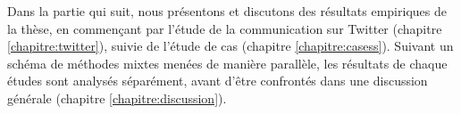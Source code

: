Dans la partie qui suit, nous présentons et discutons des résultats empiriques de la thèse, en commençant par l'étude de la communication sur Twitter (chapitre \ref{chapitre:twitter}), suivie de l'étude de cas (chapitre \ref{chapitre:casess}). Suivant un schéma de méthodes mixtes menées de manière parallèle, les résultats de chaque études sont analysés séparément, avant d'être confrontés dans une discussion générale (chapitre \ref{chapitre:discussion}).
